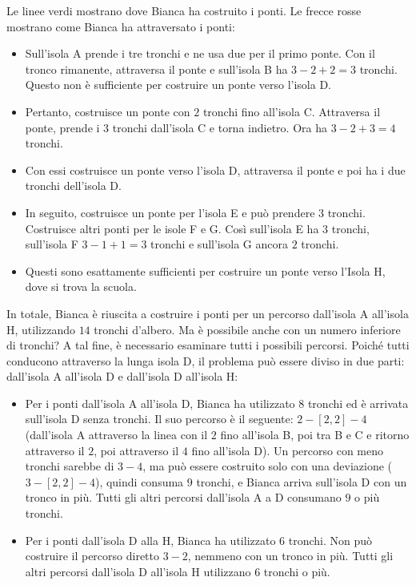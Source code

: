{{{\centering%
\par}

Le linee verdi mostrano dove Bianca ha costruito i ponti. Le frecce rosse mostrano come Bianca ha attraversato i ponti:

\begin{itemize}
  \item Sull’isola A prende i tre tronchi e ne usa due per il primo ponte. Con il tronco rimanente, attraversa il ponte e sull’isola B ha ${3 - 2 + 2 = 3}$ tronchi.  Questo non è sufficiente per costruire un ponte verso l’isola D.
  \item Pertanto, costruisce un ponte con $2$ tronchi fino all’isola C. Attraversa il ponte, prende i $3$ tronchi dall’isola C e torna indietro.  Ora ha ${3 - 2 + 3 = 4}$ tronchi.
  \item Con essi costruisce un ponte verso l’isola D, attraversa il ponte e poi ha i due tronchi dell’isola D.
  \item In seguito, costruisce un ponte per l’isola E e può prendere $3$ tronchi. Costruisce altri ponti per le isole F e G. Così sull’isola E ha $3$ tronchi, sull’isola F ${3 - 1 + 1 = 3}$ tronchi e sull’isola G ancora $2$ tronchi.
  \item Questi sono esattamente sufficienti per costruire un ponte verso l’Isola H, dove si trova la scuola.
\end{itemize}

In totale, Bianca è riuscita a costruire i ponti per un percorso dall’isola A all’isola H, utilizzando $14$ tronchi d’albero.  Ma è possibile anche con un numero inferiore di tronchi? A tal fine, è necessario esaminare tutti i possibili percorsi. Poiché tutti conducono attraverso la lunga isola D, il problema può essere diviso in due parti: dall’isola A all’isola D e dall’isola D all’isola H:

\begin{itemize}
  \item Per i ponti dall’isola A all’isola D, Bianca ha utilizzato $8$ tronchi ed è arrivata sull’isola D senza tronchi.  Il suo percorso è il seguente: ${2-[2,2]-4}$ (dall’isola A attraverso la linea con il $2$ fino all’isola B, poi tra B e C e ritorno attraverso il $2$, poi attraverso il $4$ fino all’isola D). Un percorso con meno tronchi sarebbe di ${3-4}$, ma può essere costruito solo con una deviazione (${3-[2,2]-4}$), quindi consuma $9$ tronchi, e Bianca arriva sull’isola D con un tronco in più. Tutti gli altri percorsi dall’isola A a D consumano $9$ o più tronchi.
  \item Per i ponti dall’isola D alla H, Bianca ha utilizzato $6$ tronchi. Non può costruire il percorso diretto ${3-2}$, nemmeno con un tronco in più. Tutti gli altri percorsi dall’isola D all’isola H utilizzano $6$ tronchi o più.
\end{itemize}

}}
